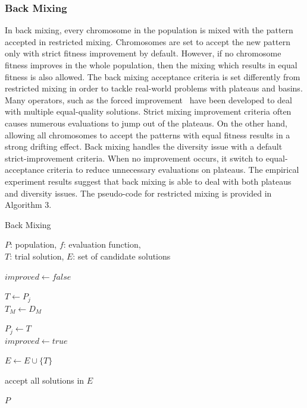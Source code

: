 \documentclass{sig-alternate-05-2015}
\begin{document}
\subsubsection{Back Mixing}
In back mixing, every chromosome in the population is mixed with the pattern accepted in restricted mixing. Chromosomes are set to accept the new pattern only with strict fitness improvement by default. However, if no chromosome fitness improves in the whole population, then the mixing which results in equal fitness is also allowed. The back mixing acceptance criteria is set differently from restricted mixing in order to tackle real-world problems with plateaus and basins. Many operators, such as the forced improvement~\cite{bosman:LT-GOMEA} have been developed to deal with multiple equal-quality solutions. Strict mixing improvement criteria often causes numerous evaluations to jump out of the plateaus. On the other hand, allowing all chromosomes to accept the patterns with equal fitness results in a strong drifting effect. Back mixing handles the diversity issue with a default strict-improvement criteria. When no improvement occurs, it switch to equal-acceptance criteria to reduce unnecessary evaluations on plateaus. The empirical experiment results suggest that back mixing is able to deal with both plateaus and diversity issues. The pseudo-code for  restricted mixing is provided in Algorithm 3.

\begin{algorithm}
\caption{Back Mixing}\label{algo_disjdecomp}

$P$: population, $f$: evaluation function, \\
$T$: trial solution, $E$: set of candidate solutions 


\BlankLine

$improved  \leftarrow false$ \\
 {

    $T \leftarrow P_j$ \\
    $T_M \leftarrow D_M$ \\

     {

        $P_j \leftarrow T$ \\
        $improved  \leftarrow true$ \\
    }{
         {
            $E \leftarrow E \cup \{T\}$ \\
        }
    }
}
 {
    accept all solutions in $E$ \\
} 

\Return $P$

\end{algorithm} 
\end{document}

